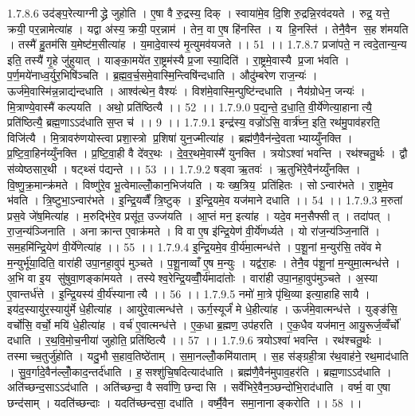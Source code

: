 1.7.8.6
उद॑ङ्प॒रेत्याग्नीद्ध्रे जुहोति । ए॒षा वै रु॒द्रस्य॒ दिक् । स्वाया॑मे॒व दि॒शि रु॒द्रन्नि॒रव॑दयते । रुद्र॒ यत्ते॒ क्रयी॒ पर॒न्नामेत्या॑ह । यद्वा अ॑स्य॒ क्रयी॒ पर॒न्नाम॑ । तेन॒ वा ए॒ष हि॑नस्ति । य हि॒नस्ति॑ । तेनै॒वैन॑ स॒ह श॑मयति । तस्मै॑ हु॒तम॑सि य॒मेष्ट॑म॒सीत्या॑ह । य॒मादे॒वास्य॑ मृ॒त्युमव॑यजते ।। 51 ।।
1.7.8.7
प्रजा॑पते॒ न त्वदे॒तान्य॒न्य इति॒ तस्यै॑ गृ॒हे जु॑हुयात् । याङ्का॒मये॑त रा॒ष्ट्रम॑स्यै प्र॒जा स्या॒दिति॑ । रा॒ष्ट्रमे॒वास्यै प्र॒जा भ॑वति । प॒र्ण॒मये॑नाध्व॒र्युर॒भिषि॑ञ्चति । ब्र॒ह्म॒व॒र्च॒समे॒वास्मि॒न्त्विषि॑न्दधाति । औदु॑म्बरेण राज॒न्यः॑ । ऊर्ज॑मे॒वास्मि॑न्न॒न्नाद्य॑न्दधाति । आश्व॑त्थेन॒ वैश्यः॑ । विश॑मे॒वास्मि॒न्पुष्टि॑न्दधाति । नैय॑ग्रोधेन॒ जन्यः॑ । मि॒त्राण्ये॒वास्मै॑ कल्पयति । अथो॒ प्रति॑ष्ठित्यै ।। 52 ।।
1.7.9.0
प॒द्य॒न्ते॒ द॒धा॒ति॒ वी॒र्ये॑णेत्या॒हानात्यै॒ प्रति॑ष्ठित्यै॒ ब्रह्म॒णाऽऽद॑धाति स॒प्त च॑ ।। 9 ।।
1.7.9.1
इन्द्र॑स्य॒ वज्रो॑ऽसि॒ वार्त्र॑घ्न॒ इति॒ रथ॑मु॒पाव॑हरति॒ विजि॑त्यै । मि॒त्रावरु॑णयोस्त्वा प्रशा॒स्त्रो प्र॒शिषा॑ युन॒ज्मीत्या॑ह । ब्रह्म॑णै॒वैन॑न्दे॒वताभ्याय्युँनक्ति । प्र॒ष्टि॒वा॒हिन॑य्युँनक्ति । प्र॒ष्टि॒वा॒ही वै दे॑वर॒थः । दे॒व॒र॒थमे॒वास्मै॑ युनक्ति । त्रयोऽश्वा॑ भवन्ति । रथ॑श्चतु॒र्थः । द्वौ स॑व्येष्ठसार॒थी । षट्थ्सं प॑द्यन्ते ।। 53 ।।
1.7.9.2
षड्वा ऋ॒तवः॑ । ऋ॒तुभि॑रे॒वैन॑य्युँनक्ति । वि॒ष्णु॒क्र॒मान्क्र॑मते । विष्णु॑रे॒व भू॒त्वेमाल्लोँ॒कान॒भिज॑यति । यः ख्ष॒त्रिय॒ प्रति॑हितः । सोऽन्वार॑भते । रा॒ष्ट्रमे॒व भ॑वति । त्रि॒ष्टुभा॒ऽन्वार॑भते । इ॒न्द्रि॒यव्वैँ त्रि॒ष्टुक् । इ॒न्द्रि॒यमे॒व यज॑माने दधाति ।। 54 ।।
1.7.9.3
म॒रुतां प्रस॒वे जे॑ष॒मित्या॑ह । म॒रुद्भि॑रे॒व प्रसू॑त॒ उज्ज॑यति । आ॒प्तं मन॒ इत्या॑ह । यदे॒व मन॒सैफ्सीत् । तदा॑पत् । रा॒ज॒न्य॑ञ्जिनाति । अनाक्रान्त ए॒वाक्र॑मते । वि वा ए॒ष इ॑न्द्रि॒येण॑ वी॒र्ये॑णर्ध्यते । यो रा॑ज॒न्य॑ञ्जि॒नाति॑ । सम॒हमि॑न्द्रि॒येण॑ वी॒र्ये॑णेत्या॑ह ।। 55 ।।
1.7.9.4
इ॒न्द्रि॒यमे॒व वी॒र्य॑मा॒त्मन्ध॑त्ते । प॒शू॒नां म॒न्युर॑सि॒ तवे॑व मे म॒न्युर्भू॑या॒दिति॒ वारा॑ही उपा॒नहा॒वुप॑ मुञ्चते । प॒शू॒नाव्वाँ ए॒ष म॒न्युः । यद्व॑रा॒हः । तेनै॒व प॑शू॒नां म॒न्युमा॒त्मन्ध॑त्ते । अ॒भि वा इ॒य सु॑षुवा॒णङ्का॑मयते । तस्येश्व॒रेन्द्रि॒यव्वीँ॒र्य॑मादा॑तोः । वारा॑ही उपा॒नहा॒वुप॑मुञ्चते । अ॒स्या ए॒वान्तर्ध॑त्ते । इ॒न्द्रि॒यस्य॑ वी॒र्य॑स्यानात्यै ।। 56 ।।
1.7.9.5
नमो॑ मा॒त्रे पृ॑थि॒व्या इत्या॒हाहि॑सायै । इय॑द॒स्यायु॑र॒स्यायु॑र्मे धे॒हीत्या॑ह । आयु॑रे॒वात्मन्ध॑त्ते । ऊर्ग॒स्यूर्जं॑ मे धे॒हीत्या॑ह । ऊर्ज॑मे॒वात्मन्ध॑त्ते । युङ्ङ॑सि॒ वर्चो॑सि॒ वर्चो॒ मयि॑ धे॒हीत्या॑ह । वर्च॑ ए॒वात्मन्ध॑त्ते । ए॒क॒धा ब्र॒ह्मण॒ उप॑हरति । ए॒क॒धैव यज॑मान॒ आयु॒रूर्ज॒व्वँर्चो॑ दधाति । र॒थ॒वि॒मो॒च॒नीया॑ जुहोति॒ प्रति॑ष्ठित्यै ।। 57 ।।
1.7.9.6
त्रयोऽश्वा॑ भवन्ति । रथ॑श्चतु॒र्थः । तस्माच्च॒तुर्जु॑होति । यदु॒भौ स॒हाव॒तिष्ठे॑ताम् । स॒मा॒नल्लोँ॒कमि॑याताम् । स॒ह स॑ङ्ग्रही॒त्रा र॑थ॒वाह॑ने॒ रथ॒माद॑धाति । सु॒व॒र्गादे॒वैन॑ल्लोँ॒काद॒न्तर्द॑धाति । ह॒॒सश्शु॑चि॒षदित्याद॑धाति । ब्रह्म॑णै॒वैन॑मुपाव॒हर॑ति । ब्रह्म॒णाऽऽद॑धाति । अति॑च्छन्द॒साऽऽद॑धाति । अति॑च्छन्दा॒ वै सर्वा॑णि॒ छन्दा॑सि । सर्वे॑भिरे॒वैन॒ञ्छन्दो॑भि॒राद॑धाति । वर्ष्म॒ वा ए॒षा छन्द॑साम् । यदति॑च्छन्दाः । यदति॑च्छन्दसा॒ दधा॑ति । वर्ष्मै॒वैन॑ समा॒नानाङ्करोति ।। 58 ।।
